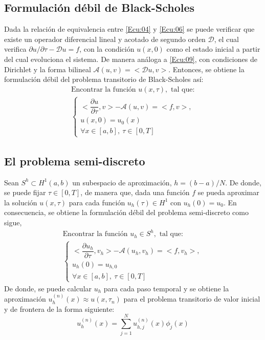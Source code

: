 \documentclass[12pt]{article}
\begin{document}
\subsection{Formulación débil de Black-Scholes}
Dada la relación de equivalencia entre \eqref{Ecu:04} y \eqref{Ecu:06} se puede verificar que existe un operador diferencial lineal y acotado de segundo orden $\mathcal{D}$, el cual verifica $\partial{u}/\partial{\tau}-\mathcal{D}u = \textit{f} \label{Ecu:30} $, con la condición $u(x,0)$ como el estado inicial a partir del cual evoluciona el sistema. De manera análoga a \eqref{Ecu:09}, con condiciones de Dirichlet y la forma bilineal $\mathcal{A}(u,v) = <\mathcal{D}u,v>$. Entonces, se obtiene la formulación débil del problema transitorio de Black-Scholes así:
\begin{equation*}
\begin{array}{l}
\text{Encontrar la función }\textit{u}(x,\tau), \text{ tal que:}\\
\left\{
\begin{array}{l}
<\dfrac{\partial{u}}{\partial{\tau}},v> - \mathcal{A}(u,v)
=  <f,v>,\\
u(x,0) = u_0(x)\\
\forall x \in [a,b], \ \tau \in [0,T]
\end{array}\right. 
\label{Ecu:31}
\end{array}
\end{equation*}
\subsection{El problema semi-discreto} \quad Sean $S^h \subset H^1(a,b)$ un subespacio de aproximación, $h=(b-a)/N$. De donde, se puede fijar $\tau \in [0,T]$, de manera que, dada una función $\textit{f}$ se pueda aproximar la solución $\textit{u}(x,\tau)$ para cada función $u_h(\tau) \in H^1$ con $u_h(0)=u_0$. En consecuencia, se obtiene la formulación débil del problema semi-discreto como sigue,
 \begin{equation}
\begin{array}{l}
\text{Encontrar la función } \textit{u}_h\in S^h,\text{ tal que: }\\[0.3cm]
\left\{
\begin{array}{l}
 <\dfrac{\partial{u_h}}{\partial{\tau}},v_h> - \mathcal{A}(u_h,v_h)
 =  <f,v_h>,\\
 u_h(0) = u_{h,0}\\
\forall x \in [a,b], \ \tau \in [0,T]
\end{array}\right. 
\end{array}
\label{Ecu:32}
 \end{equation}
 De donde, se puede calcular $u_h$ para cada paso temporal y se obtiene la aproximación $ \textit{u}_h^{(n)}(x) \approx u(x,\tau_n) $ para el problema transitorio de valor inicial y de frontera de la forma siguiente:
\begin{equation*}\textit{u}_h^{(n)}(x) = \sum_{j=1}^{N} u_{h,j}^{(n)}(x)\phi_j(x)\end{equation*}
 
\end{document}
